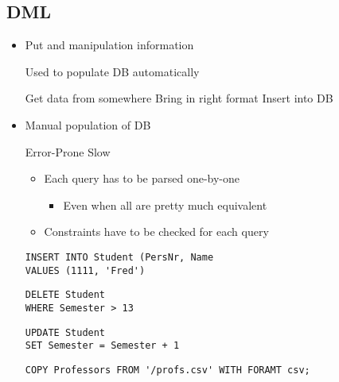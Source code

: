 \subsection{DML}
\begin{itemize}
    \item
        Put and manipulation information

     Used to populate DB automatically
        \begin{itemize}
             Get data from somewhere
             Bring in right format
             Insert into DB
        \end{itemize}
    \item Manual population of DB
        \begin{itemize}
            \icon Error-Prone
            \icon Slow
                \begin{itemize}
                    \item Each query has to be parsed one-by-one
                        \begin{itemize}
                            \item Even when all are pretty much equivalent
                        \end{itemize}
                    \item Constraints have to be checked for each query
                \end{itemize}
        \end{itemize}
\begin{verbatim}
INSERT INTO Student (PersNr, Name
VALUES (1111, 'Fred')
\end{verbatim}

\begin{verbatim}
DELETE Student
WHERE Semester > 13
\end{verbatim}

\begin{verbatim}
UPDATE Student
SET Semester = Semester + 1
\end{verbatim}

\begin{verbatim}
COPY Professors FROM '/profs.csv' WITH FORAMT csv;
\end{verbatim}
\end{itemize}

